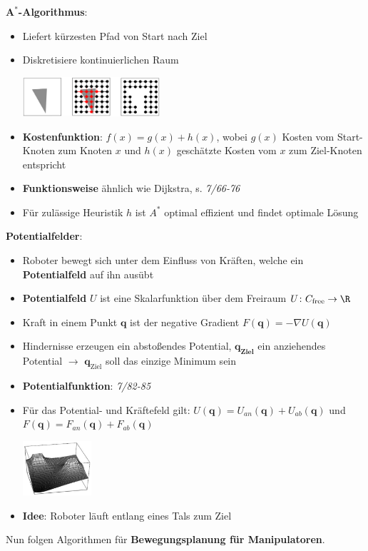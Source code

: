 \bigskip
\textbf{$\mathbf{A^*}$-Algorithmus}:
\begin{itemize}
	\item Liefert kürzesten Pfad von Start nach Ziel
	\item Diskretisiere kontinuierlichen Raum
	\begin{center}
		\includegraphics[width=0.4\textwidth]{images/a-s.png}
	\end{center}
	\item \textbf{Kostenfunktion}: $f(x)=g(x)+h(x)$, wobei $g(x)$ Kosten vom Start-Knoten zum Knoten $x$ und $h(x)$ geschätzte Kosten vom $x$ zum Ziel-Knoten entspricht
	\item \textbf{Funktionsweise} ähnlich wie Dijkstra, s. \textit{7/66-76}
	\item Für zulässige Heuristik $h$ ist $A^*$ optimal effizient und findet optimale Lösung
\end{itemize}
\bigskip
\textbf{Potentialfelder}:
\begin{itemize}
	\item Roboter bewegt sich unter dem Einfluss von Kräften, welche ein \textbf{Potentialfeld} auf ihn ausübt
	\item \textbf{Potentialfeld} $U$ ist eine Skalarfunktion über dem Freiraum $U\colon C_\text{free}\rightarrow \R$
	\item Kraft in einem Punkt $\mathbf{q}$ ist der negative Gradient $F(\mathbf{q})=-\nabla U(\mathbf{q})$
	\item Hindernisse erzeugen ein abstoßendes Potential, $\mathbf{q_\text{Ziel}}$ ein anziehendes Potential $\rightarrow$ $\mathbf{q}_\text{Ziel}$ soll das einzige Minimum sein
	\item \textbf{Potentialfunktion}: \textit{7/82-85}
	\item Für das Potential- und Kräftefeld gilt: $U(\mathbf{q})=U_{an}(\mathbf{q})+U_{ab}(\mathbf{q})$ und $F(\mathbf{q})=F_{an}(\mathbf{q})+F_{ab}(\mathbf{q})$
	\begin{center}
		\includegraphics[width=0.2\textwidth]{images/potfeld.png}
	\end{center}
	\item \textbf{Idee}: Roboter läuft entlang eines Tals zum Ziel
\end{itemize}
\bigskip
Nun folgen Algorithmen für \textbf{Bewegungsplanung für Manipulatoren}.

